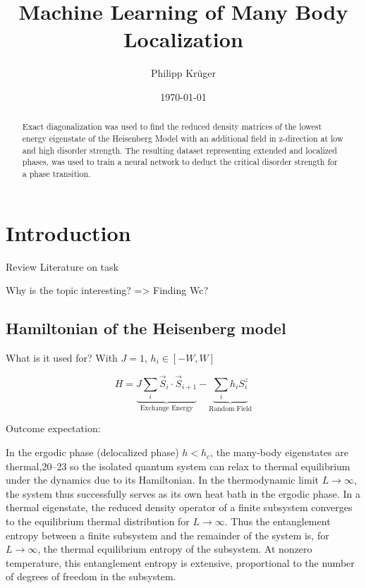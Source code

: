 \documentclass[reprint,amsmath,amssymb,aps,prb]{revtex4-2}
\begin{document}
%

\title{Machine Learning of Many Body Localization}

\author{Philipp Krüger}

\date{\today}%

\begin{abstract}
Exact diagonalization was used to find the reduced density matrices of the lowest energy eigenstate of the Heisenberg Model with an additional field in z-direction at low and high disorder strength. The resulting dataset representing extended and localized phases, was used to train a neural network to deduct the critical disorder strength for a phase transition. 
\end{abstract}


\maketitle

\section{Introduction}%

Review Literature on task

Why is the topic interesting? => Finding Wc?

\subsection{Hamiltonian of the Heisenberg model}

What is it used for? With $J=1$, $h_i \in \left[-W, W\right]$

\begin{equation}
	H=\underbrace{J\sum_i \vec{S}_i\cdot\vec{S}_{i+1}}_{\text{Exchange Energy}}-\underbrace{\sum_ih_iS_i^z}_{\text{Random Field}}
\end{equation}

Outcome expectation: 

In the ergodic phase (delocalized phase) $h<h_c$, the many-body eigenstates
are thermal,20–23 so the isolated quantum system can relax to
thermal equilibrium under the dynamics due to its Hamiltonian.
In the thermodynamic limit $L\rightarrow\infty$, the system thus
successfully serves as its own heat bath in the ergodic phase.
In a thermal eigenstate, the reduced density operator of a
finite subsystem converges to the equilibrium thermal distribution
for $L\rightarrow\infty$. Thus the entanglement entropy between a
finite subsystem and the remainder of the system is, for  $L\rightarrow\infty$, the thermal equilibrium entropy of the subsystem. At
nonzero temperature, this entanglement entropy is extensive,
proportional to the number of degrees of freedom in the subsystem.
\end{document}
